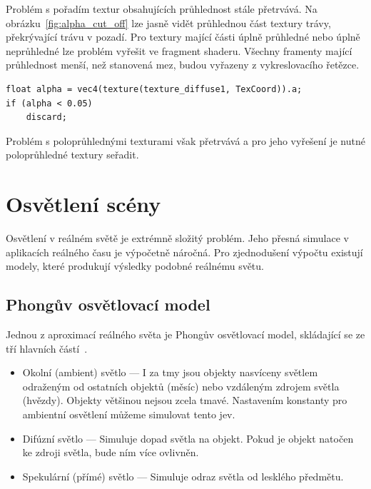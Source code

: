 \documentclass[thesis=M,czech]{FITthesis}[2019/12/23]
\begin{document}
Problém s pořadím textur obsahujících průhlednost stále přetrvává. Na obrázku~\ref{fig:alpha_cut_off} lze jasně vidět průhlednou část textury trávy, překrývající trávu v pozadí. Pro textury mající části úplně průhledné nebo úplně neprůhledné lze problém vyřešit ve fragment shaderu. Všechny framenty mající průhlednost menší, než stanovená mez, budou vyřazeny z vykreslovacího řetězce.

\begin{verbatim}
float alpha = vec4(texture(texture_diffuse1, TexCoord)).a;
if (alpha < 0.05)
    discard;
\end{verbatim}

Problém s poloprůhlednými texturami však přetrvává a pro jeho vyřešení je nutné poloprůhledné textury seřadit.



\chapter{Osvětlení scény}

Osvětlení v reálném světě je extrémně složitý problém. Jeho přesná simulace v aplikacích reálného času je výpočetně náročná. Pro zjednodušení výpočtu existují modely, které produkují výsledky podobné reálnému světu.

\section{Phongův osvětlovací model}

Jednou z aproximací reálného světa je Phongův osvětlovací model, skládající se ze tří hlavních částí~\cite{lopgl_basic_light}.

\begin{itemize}
\item Okolní (ambient) světlo --- I za tmy jsou objekty nasvíceny světlem odraženým od ostatních objektů (měsíc) nebo vzdáleným zdrojem světla (hvězdy). Objekty většinou nejsou zcela tmavé. Nastavením konstanty pro ambientní osvětlení můžeme simulovat tento jev.

\item Difúzní světlo --- Simuluje dopad světla na objekt. Pokud je objekt natočen ke zdroji světla, bude ním více ovlivněn. 

\item Spekulární (přímé) světlo  --- Simuluje odraz světla od lesklého předmětu.
\end{itemize}
\end{document}
